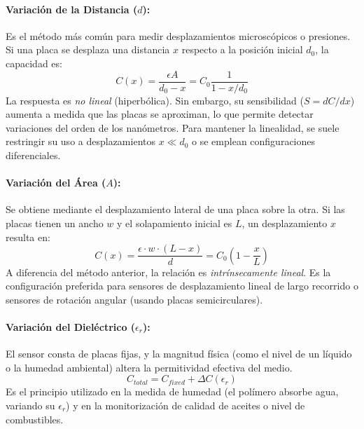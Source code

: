 \paragraph{Variación de la Distancia ($d$):}
Es el método más común para medir desplazamientos microscópicos o presiones. Si una placa se desplaza una distancia $x$ respecto a la posición inicial $d_0$, la capacidad es:
\begin{equation}
    C(x) = \frac{\epsilon A}{d_0 - x} = C_0 \frac{1}{1 - x/d_0}
\end{equation}
La respuesta es \emph{no lineal} (hiperbólica). Sin embargo, su sensibilidad ($S = dC/dx$) aumenta a medida que las placas se aproximan, lo que permite detectar variaciones del orden de los nanómetros. Para mantener la linealidad, se suele restringir su uso a desplazamientos $x \ll d_0$ o se emplean configuraciones diferenciales.

\paragraph{Variación del Área ($A$):}
Se obtiene mediante el desplazamiento lateral de una placa sobre la otra. Si las placas tienen un ancho $w$ y el solapamiento inicial es $L$, un desplazamiento $x$ resulta en:
\begin{equation}
    C(x) = \frac{\epsilon \cdot w \cdot (L - x)}{d} = C_0 \left( 1 - \frac{x}{L} \right)
\end{equation}
A diferencia del método anterior, la relación es \emph{intrínsecamente lineal}. Es la configuración preferida para sensores de desplazamiento lineal de largo recorrido o sensores de rotación angular (usando placas semicirculares).

\paragraph{Variación del Dieléctrico ($\epsilon_r$):}
El sensor consta de placas fijas, y la magnitud física (como el nivel de un líquido o la humedad ambiental) altera la permitividad efectiva del medio.
\begin{equation}
    C_{total} = C_{fixed} + \Delta C(\epsilon_r)
\end{equation}
Es el principio utilizado en la medida de humedad (el polímero absorbe agua, variando su $\epsilon_r$) y en la monitorización de calidad de aceites o nivel de combustibles.

